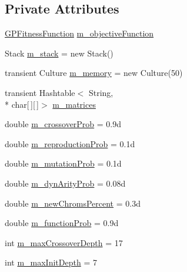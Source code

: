 \subsection*{Private Attributes}
\begin{DoxyCompactItemize}
\item 
\hyperlink{classorg_1_1jgap_1_1gp_1_1_g_p_fitness_function}{G\-P\-Fitness\-Function} \hyperlink{classorg_1_1jgap_1_1gp_1_1impl_1_1_g_p_configuration_a620f23497a17109be4d8394cc1c541e1}{m\-\_\-objective\-Function}
\item 
Stack \hyperlink{classorg_1_1jgap_1_1gp_1_1impl_1_1_g_p_configuration_afe6a1da01b8884546c356f0c6403a280}{m\-\_\-stack} = new Stack()
\item 
transient Culture \hyperlink{classorg_1_1jgap_1_1gp_1_1impl_1_1_g_p_configuration_a7e50c9aabf2bc85ca304a6b1c59b35a4}{m\-\_\-memory} = new Culture(50)
\item 
transient Hashtable$<$ String, \\*
char\mbox{[}$\,$\mbox{]}\mbox{[}$\,$\mbox{]}$>$ \hyperlink{classorg_1_1jgap_1_1gp_1_1impl_1_1_g_p_configuration_ad929121e2d7bb26b53dcb2dc87d20f14}{m\-\_\-matrices}
\item 
double \hyperlink{classorg_1_1jgap_1_1gp_1_1impl_1_1_g_p_configuration_a5473daf5ed501e61edad891f29507fed}{m\-\_\-crossover\-Prob} = 0.\-9d
\item 
double \hyperlink{classorg_1_1jgap_1_1gp_1_1impl_1_1_g_p_configuration_a458e34d63b6669e2d71c76b335c143da}{m\-\_\-reproduction\-Prob} = 0.\-1d
\item 
double \hyperlink{classorg_1_1jgap_1_1gp_1_1impl_1_1_g_p_configuration_a5f72278a7b65171a71d242346d1df037}{m\-\_\-mutation\-Prob} = 0.\-1d
\item 
double \hyperlink{classorg_1_1jgap_1_1gp_1_1impl_1_1_g_p_configuration_a0256459404ad8e7af4d6b103eabb90d4}{m\-\_\-dyn\-Arity\-Prob} = 0.\-08d
\item 
double \hyperlink{classorg_1_1jgap_1_1gp_1_1impl_1_1_g_p_configuration_a3dc5be9e48cc959bcd8c8eff84c12c62}{m\-\_\-new\-Chroms\-Percent} = 0.\-3d
\item 
double \hyperlink{classorg_1_1jgap_1_1gp_1_1impl_1_1_g_p_configuration_a2bfa04104b91d80536f11ce85999f100}{m\-\_\-function\-Prob} = 0.\-9d
\item 
int \hyperlink{classorg_1_1jgap_1_1gp_1_1impl_1_1_g_p_configuration_a69bbcc24fa4b350fa5da14070ae61740}{m\-\_\-max\-Crossover\-Depth} = 17
\item 
int \hyperlink{classorg_1_1jgap_1_1gp_1_1impl_1_1_g_p_configuration_ab372fad0a650dd4f56857750f263176f}{m\-\_\-max\-Init\-Depth} = 7

\end{DoxyCompactItemize}
